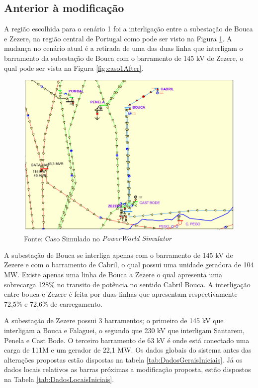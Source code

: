 \subsection{Anterior à modificação}

A região escolhida para o cenário 1 foi a interligação entre a subestação de Bouca e Zezere, na região central de Portugal como pode ser visto na Figura \ref{fig:caso1}. A mudança no cenário atual é a retirada de uma das duas linha que interligam o barramento da subestação de Bouca com o barramento de 145 kV de Zezere, o qual pode ser vista na Figura \ref{fig:caso1After}.

\begin{figure}[H]
	\centering
	\captionsetup{width=1\textwidth, font=footnotesize, textfont=bf}	
	\includegraphics[width=1\linewidth]{img/caso1.pdf}
	\caption{Cenário 1, anterior à modificação}
	\vspace{-3.5mm}
	\caption*{Fonte: Caso Simulado no \textit{PowerWorld\textsuperscript{\textregistered} Simulator}}
	\label{fig:caso1}
\end{figure}

A subestação de Bouca se interliga apenas com o barramento de 145 kV de Zezere e com o barramento de Cabril, o qual possui uma unidade geradora de 104 MW. Existe apenas uma linha de Bouca a Zezere o qual apresenta uma sobrecarga 128\% no transito de potência no sentido Cabril Bouca. A interligação entre bouca e Zezere é feita por duas linhas que apresentam respectivamente  72,5\% e 72,6\% de carregamento.

A subestação de Zezere possui 3 barramentos; o primeiro de 145 kV que interligam a Bouca e Falaguei, o segundo que 230 kV que interligam Santarem, Penela e Cast Bode. O terceiro barramento de 63 kV é onde está conectado uma carga de 111M e um gerador de 22,1 MW. Os dados globais do sistema antes das alterações propostas estão dispostas na tabela \ref{tab:DadosGeraisIniciais}. Já os dados locais relativos as barras próximas a modificação proposta, estão dispostos na Tabela \ref{tab:DadosLocaisIniciais}.


